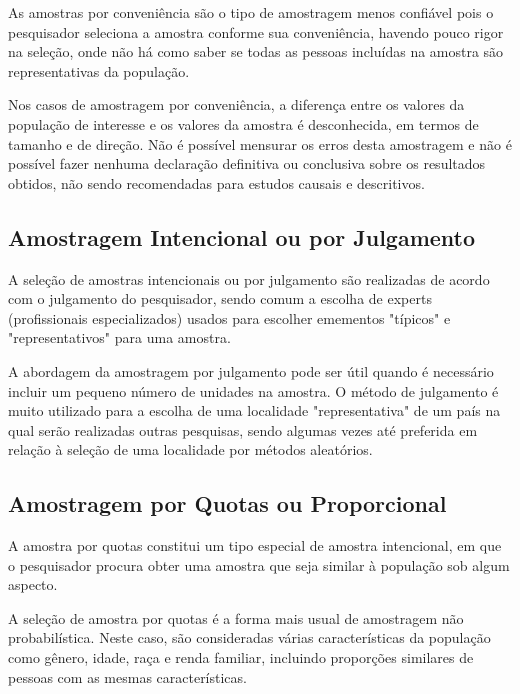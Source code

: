 As amostras por conveniência são o tipo de amostragem menos confiável pois o pesquisador seleciona a amostra conforme sua conveniência, havendo pouco rigor na seleção, onde não há como saber se todas as pessoas incluídas na amostra são representativas da população.\vskip0.3cm



Nos casos de amostragem por conveniência, a diferença entre os valores da população de interesse e os valores da amostra é desconhecida, em termos de tamanho e de direção. Não é possível mensurar os erros desta amostragem e não é possível fazer nenhuma declaração definitiva ou conclusiva sobre os resultados obtidos, não sendo recomendadas para estudos causais e descritivos.




\subsection{Amostragem Intencional ou por Julgamento}

A seleção de amostras intencionais ou por julgamento são realizadas de acordo com o julgamento do pesquisador, sendo comum a escolha de experts (profissionais especializados) usados para escolher emementos "típicos" e "representativos" para uma amostra.
\vskip0.3cm


A abordagem da amostragem por julgamento pode ser útil quando é necessário incluir um pequeno número de unidades na amostra. O método de julgamento é muito utilizado para a escolha de uma localidade "representativa" de um país na qual serão realizadas outras pesquisas, sendo algumas vezes até preferida em relação à seleção de uma localidade por métodos aleatórios.


\subsection{Amostragem por Quotas ou Proporcional}


A amostra por quotas constitui um tipo especial de amostra intencional, em que o pesquisador procura obter uma amostra que seja similar à população sob algum aspecto.\vskip0.3cm

A seleção de amostra por quotas é a forma mais usual de amostragem não probabilística. Neste caso, são consideradas várias características da população como gênero, idade, raça e renda familiar, incluindo proporções similares de pessoas com as mesmas características.\vskip0.3cm



